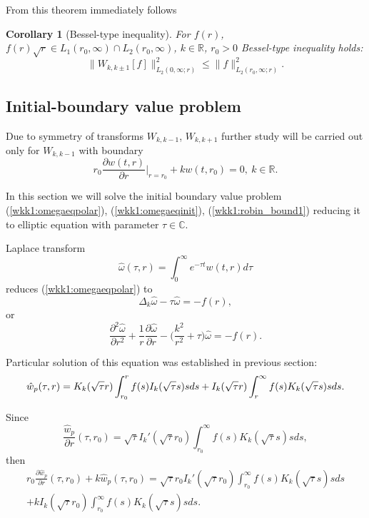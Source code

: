 \documentclass[manuscript, printscheme]{paper}
\newtheorem{cor}[thm]{Corollary}
\newcommand{\RM}{\mathbb{R}}
\newcommand{\CM}{\mathbb{C}}
\begin{document}
From this theorem  immediately follows
\begin{cor}[Bessel-type inequality]For $f(r)$, $f(r) \sqrt r \in L_1(r_0,\infty)\cap L_2(r_0,\infty)$, $k \in \RM$, $r_0>0$ Bessel-type inequality holds:
$$
\| W_{k,k\pm 1}[f] \|_{L_2(0,\infty; r) }^2 \leq \|f\|_{L_2(r_0,\infty; r)}^2. 
$$
\end{cor}


\subsection{Initial-boundary value problem}

Due to symmetry of transforms $W_{k,k-1}$, $W_{k,k+1}$ further study will be carried out only for $W_{k,k-1}$ with boundary
\begin{equation}\label{wkk1:robin_bound1}
r_0\frac{\partial w(t,r)}{\partial r}\Big|_{r=r_0} + k w(t,r_0) = 0,~k \in \RM.
\end{equation}

In this section we will solve the initial boundary value problem (\ref{wkk1:omegaeqpolar}), (\ref{wkk1:omegaeqinit}),  (\ref{wkk1:robin_bound1}) reducing it to elliptic equation with parameter $\tau \in \CM$.

Laplace transform
$$
 \hat \omega(\tau,r)=\int_0^\infty e^{-\tau t}w(t,r) d\tau
$$
reduces (\ref{wkk1:omegaeqpolar}) to 
\begin{equation}\label{wkk1:poison}
\Delta_k \hat \omega - \tau \hat \omega  = - f(r),
\end{equation}
or
\begin{equation} \label{wkk1:besselrhs}
 \frac{\partial^2 \hat \omega}{\partial r^2} + \frac1r \frac{\partial \hat \omega}{\partial r} - \Big(\frac{k^2}{r^2} + \tau \Big) \hat \omega = -f(r).
\end{equation}
 
Particular solution of this equation was established in previous section:
$$\hat w_p(\tau, r) = K_k(\sqrt{\tau}r)\int_{r_0}^r f(s) I_k(\sqrt{\tau}s) s ds \nonumber \\ + 
I_k(\sqrt{\tau}r)\int_r^{\infty} f(s) K_k(\sqrt{\tau}s) s ds. $$


Since
$$
\frac{\hat w_p}{\partial r}(\tau, r_0) = \sqrt \tau I_k'(\sqrt \tau r_0) \int_{r_0}^\infty f(s) K_k(\sqrt{\tau}s) s ds,
$$
then
\begin{align*}
r_0{\frac{\partial \hat w_p}{\partial r }} (\tau,r_0) + k \hat w_p(\tau,r_0)  =  \sqrt \tau r_0 I_k'(\sqrt \tau r_0) \int_{r_0}^\infty f(s) K_k(\sqrt{\tau}s) s ds \\ + k I_k(\sqrt{\tau}r_0)
 \nonumber  \int_{r_0}^\infty f(s) K_k(\sqrt{\tau}s) s ds.
\end{align*}
\end{document}
